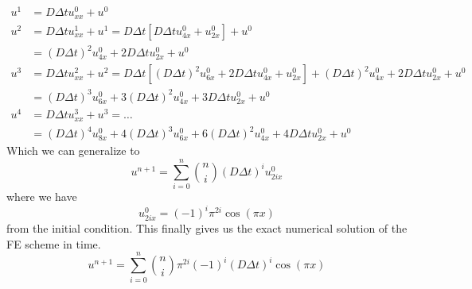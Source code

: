 \begin{align*}
 u^1 &= D\Delta t u_{xx}^0 + u^0 \\
 u^2 &= D\Delta t u_{xx}^1 + u^1 = D\Delta t\left[D\Delta t u_{4x}^0 + u_{2x}^0\right] + u^0\\
 &= \left(D\Delta t\right)^2 u_{4x}^0 + 2D\Delta t u_{2x}^0+ u^0 \\
 u^3 &= D\Delta t u_{xx}^2 + u^2 = D\Delta t\left[\left(D\Delta t\right)^2 u_{6x}^0 + 2D\Delta t u_{4x}^0+ u_{2x}^0\right] + \left(D\Delta t\right)^2 u_{4x}^0 + 2D\Delta t u_{2x}^0+ u^0\\
 &= \left(D\Delta t\right)^3 u_{6x}^0 + 3\left(D\Delta t\right)^2 u_{4x}^0+ 3D\Delta tu_{2x}^0 + u^0 \\
 u^4 &= D\Delta t u_{xx}^3 + u^3 = \dots \\
 &= \left(D\Delta t\right)^4 u_{8x}^0 + 4\left(D\Delta t\right)^3 u_{6x}^0+ 6\left(D\Delta t\right)^2 u_{4x}^0 + 4D\Delta t u_{2x}^0 + u^0 
\end{align*}
Which we can generalize to 
\begin{equation}
 u^{n+1} = \sum\limits_{i=0}^n {n\choose i}\left(D\Delta t\right)^iu^0_{2ix}
\end{equation}
where we have
\begin{equation*}
 u^0_{2ix} = \left(-1\right)^i\pi^{2i}\cos(\pi x)
\end{equation*}
from the initial condition. This finally gives us the exact numerical solution of the FE scheme in time. 
\begin{equation}
 u^{n+1} = \sum\limits_{i=0}^n {n\choose i}\pi^{2i}\left(-1\right)^i\left(D\Delta t\right)^i\cos(\pi x)
\end{equation}

